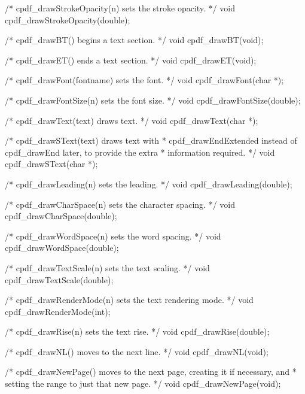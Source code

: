 /* cpdf_drawStrokeOpacity(n) sets the stroke opacity. */
void cpdf_drawStrokeOpacity(double);

/* cpdf_drawBT() begins a text section. */
void cpdf_drawBT(void);

/* cpdf_drawET() ends a text section. */
void cpdf_drawET(void);

/* cpdf_drawFont(fontname) sets the font. */
void cpdf_drawFont(char *);

/* cpdf_drawFontSize(n) sets the font size. */
void cpdf_drawFontSize(double);

/* cpdf_drawText(text) draws text. */
void cpdf_drawText(char *);

/* cpdf_drawSText(text) draws text with %
 * cpdf_drawEndExtended instead of cpdf_drawEnd later, to provide the extra
 * information required. */
void cpdf_drawSText(char *);

/* cpdf_drawLeading(n) sets the leading. */
void cpdf_drawLeading(double);

/* cpdf_drawCharSpace(n) sets the character spacing. */
void cpdf_drawCharSpace(double);

/* cpdf_drawWordSpace(n) sets the word spacing. */
void cpdf_drawWordSpace(double);

/* cpdf_drawTextScale(n) sets the text scaling. */
void cpdf_drawTextScale(double);

/* cpdf_drawRenderMode(n) sets the text rendering mode. */
void cpdf_drawRenderMode(int);

/* cpdf_drawRise(n) sets the text rise. */
void cpdf_drawRise(double);

/* cpdf_drawNL() moves to the next line. */
void cpdf_drawNL(void);

/* cpdf_drawNewPage() moves to the next page, creating it if necessary, and
 * setting the range to just that new page. */
void cpdf_drawNewPage(void);

